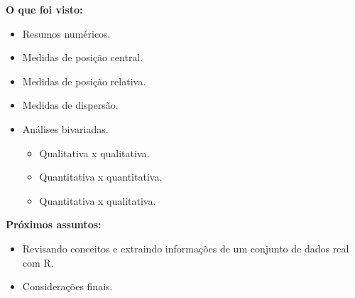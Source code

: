 \documentclass[
  ignorenonframetext,
  serif,
  professionalfont,
  usenames,
  dvipsnames,
  aspectratio = 169]{beamer}
\providecommand{\tightlist}{%
  \setlength{\itemsep}{0pt}\setlength{\parskip}{0pt}}
\renewcommand{\tightlist}{%
  \setlength{\itemsep}{0\baselineskip}
  \setlength{\parskip}{0.25\baselineskip}
}
\def\beginAHalfColumn{\begin{minipage}{0.49\textwidth}}%
\def\endColumns{\end{minipage}}%
\begin{document}
\begin{frame}{}
\label{section}
\beginAHalfColumn

\textbf{O que foi visto:}

\begin{itemize}
\tightlist
\item
  Resumos numéricos.
\item
  Medidas de posição central.
\item
  Medidas de posição relativa.
\item
  Medidas de dispersão.
\item
  Análises bivariadas.

  \begin{itemize}
  \tightlist
  \item
    Qualitativa x qualitativa.
  \item
    Quantitativa x quantitativa.
  \item
    Quantitativa x qualitativa.
  \end{itemize}
\end{itemize}

\endColumns
\beginAHalfColumn

\textbf{Próximos assuntos:}

\begin{itemize}
\tightlist
\item
  Revisando conceitos e extraindo informações de um conjunto de dados
  real com R.
\item
  Considerações finais.
\end{itemize}

\endColumns
\end{frame}
\end{document}
